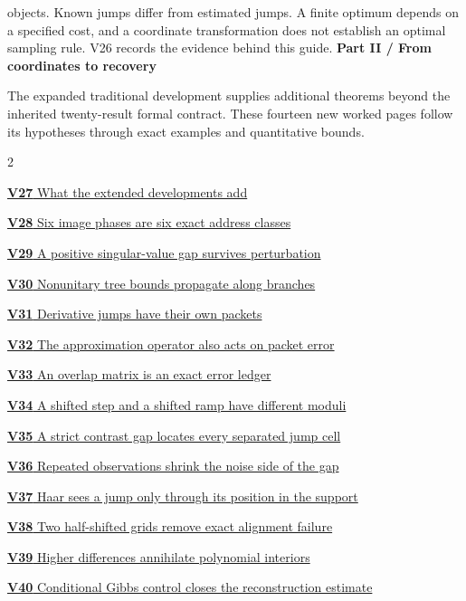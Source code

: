 \documentclass[11pt,letterpaper]{article}
\begin{document}
objects. Known jumps differ from estimated jumps. A finite optimum depends
on a specified cost, and a coordinate transformation does not establish an
optimal sampling rule. V26 records the evidence behind this guide.
\clearpage
{}
{\sffamily\bfseries\Large\color{accent}Part II / From coordinates to recovery}\par\medskip
The expanded traditional development supplies additional theorems beyond the
inherited twenty-result formal contract. These fourteen new worked pages
follow its hypotheses through exact examples and quantitative bounds.
\medskip
\begin{multicols}{2}\raggedright
{\small\noindent\hyperlink{vpage27}{\textbf{V27} What the extended developments add}\par\medskip}
{\small\noindent\hyperlink{vpage28}{\textbf{V28} Six image phases are six exact address classes}\par\medskip}
{\small\noindent\hyperlink{vpage29}{\textbf{V29} A positive singular-value gap survives perturbation}\par\medskip}
{\small\noindent\hyperlink{vpage30}{\textbf{V30} Nonunitary tree bounds propagate along branches}\par\medskip}
{\small\noindent\hyperlink{vpage31}{\textbf{V31} Derivative jumps have their own packets}\par\medskip}
{\small\noindent\hyperlink{vpage32}{\textbf{V32} The approximation operator also acts on packet error}\par\medskip}
{\small\noindent\hyperlink{vpage33}{\textbf{V33} An overlap matrix is an exact error ledger}\par\medskip}
{\small\noindent\hyperlink{vpage34}{\textbf{V34} A shifted step and a shifted ramp have different moduli}\par\medskip}
{\small\noindent\hyperlink{vpage35}{\textbf{V35} A strict contrast gap locates every separated jump cell}\par\medskip}
{\small\noindent\hyperlink{vpage36}{\textbf{V36} Repeated observations shrink the noise side of the gap}\par\medskip}
{\small\noindent\hyperlink{vpage37}{\textbf{V37} Haar sees a jump only through its position in the support}\par\medskip}
{\small\noindent\hyperlink{vpage38}{\textbf{V38} Two half-shifted grids remove exact alignment failure}\par\medskip}
{\small\noindent\hyperlink{vpage39}{\textbf{V39} Higher differences annihilate polynomial interiors}\par\medskip}
{\small\noindent\hyperlink{vpage40}{\textbf{V40} Conditional Gibbs control closes the reconstruction estimate}\par\medskip}
\end{multicols}
\end{document}
